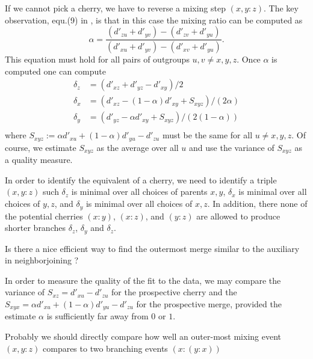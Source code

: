 \documentclass[amsmath]{lni}
\newcommand{\TODO}[1]{\begingroup\color{red}#1\endgroup}
\begin{document}
If we cannot pick a cherry, we have to reverse a mixing step $(x,y:z)$. The
key observation, equ.(9) in \cite{Prohaska:18a}, is that in this case the
mixing ratio can be computed as
\begin{equation}
  \alpha =
  \frac{(d'_{zu}+d'_{yv})-(d'_{zv}+d'_{yu})}%
       {(d'_{xu}+d'_{yv})-(d'_{xv}+d'_{yu})}.
  \label{eq:alpha}
\end{equation} 
This equation must hold for all pairs of outgroups $u,v\ne x,y,z$. Once
$\alpha$ is computed one can compute 
\begin{equation}
  \begin{split}
    \delta_z & = (d'_{xz}+d'_{yz}-d'_{xy})/2  \\
    \delta_x & = (d'_{xz}-(1-\alpha)d'_{xy} + S_{xyz})/(2\alpha) \\
    \delta_y & = (d'_{yz}-\alpha d'_{xy} +    S_{xyz})/(2(1-\alpha)) \\
  \end{split}
\end{equation}
where $S_{xyz}:=\alpha d'_{xu}+(1-\alpha)d'_{yu}-d'_{zu}$ must be the same
for all $u\ne x,y,z$. Of course, we estimate $S_{xyz}$ as the average over
all $u$ and use the variance of $S_{xyz}$ as a quality measure.

In order to identify the equivalent of a cherry, we need to identify a
triple $(x,y:z)$ such $\delta_z$ is minimal over all choices of parents
$x,y$, $\delta_x$ is minimal over all choices of $y,z$, and $\delta_y$ is
minimal over all choices of $x,z$. In addition, there none of the potential
cherries $(x:y)$, $(x:z)$, and $(y:z)$ are allowed to produce shorter
branches $\delta_z$, $\delta_y$ and $\delta_z$. 

\TODO{Is there a nice efficient way to find the outermost merge similar
  to the auxiliary in neighborjoining ?}

In order to measure the quality of the fit to the data, we may compare the
variance of $S_{xz} = d'_{xu}-d'_{zu}$ for the prospective cherry and the
$S_{xyx} = \alpha d'_{xu}+(1-\alpha)d'_{yu}-d'_{zu}$ for the prospective
merge, provided the estimate $\alpha$ is sufficiently far away from $0$ or
$1$.










\TODO{Probably we should directly compare how well an outer-most mixing
  event $(x,y:z)$ compares to two branching events $(x:(y:x))$}
\end{document}
